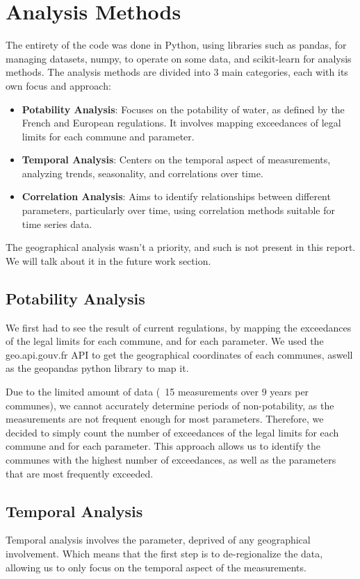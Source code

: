 \documentclass{article}
\begin{document}
\newpage
\section{Analysis Methods}
The entirety of the code was done in Python, using libraries such as pandas, for managing datasets, numpy, to operate on some data, and scikit-learn for analysis methods.
The analysis methods are divided into 3 main categories, each with its own focus and approach:
\begin{itemize}
    \item \textbf{Potability Analysis}: Focuses on the potability of water, as defined by the French and European regulations. It involves mapping exceedances of legal limits for each commune and parameter.
    \item \textbf{Temporal Analysis}: Centers on the temporal aspect of measurements, analyzing trends, seasonality, and correlations over time.
    \item \textbf{Correlation Analysis}: Aims to identify relationships between different parameters, particularly over time, using correlation methods suitable for time series data.
\end{itemize}

The geographical analysis wasn't a priority, and such is not present in this report. We will talk about it in the future work section.

\subsection{Potability Analysis}
We first had to see the result of current regulations, by mapping the exceedances of the legal limits for each commune, and for each parameter.
We used the geo.api.gouv.fr API to get the geographical coordinates of each communes, aswell as the geopandas python library to map it.

Due to the limited amount of data (~15 measurements over 9 years per communes), we cannot accurately determine periods of non-potability, as the measurements are not frequent enough for most parameters.
Therefore, we decided to simply count the number of exceedances of the legal limits for each commune and for each parameter.
This approach allows us to identify the communes with the highest number of exceedances, as well as the parameters that are most frequently exceeded.

\subsection{Temporal Analysis}
Temporal analysis involves the parameter, deprived of any geographical involvement. Which means that the first step is to de-regionalize the data, allowing us to only focus on the temporal aspect of the measurements.
\end{document}
